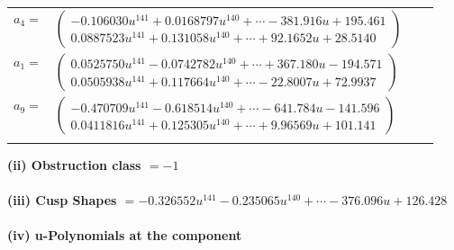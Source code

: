 \documentclass[1p]{elsarticle_modified}
\theoremstyle{definition}
\begin{document}
\begin{tabular}{m{7pt} m{180pt} m{7pt} m{180pt} }
\flushright $a_{4}=$&$\begin{pmatrix}-0.106030 u^{141}+0.0168797 u^{140}+\cdots-381.916 u+195.461\\0.0887523 u^{141}+0.131058 u^{140}+\cdots+92.1652 u+28.5140\end{pmatrix}$ \\
\flushright $a_{1}=$&$\begin{pmatrix}0.0525750 u^{141}-0.0742782 u^{140}+\cdots+367.180 u-194.571\\0.0505938 u^{141}+0.117664 u^{140}+\cdots-22.8007 u+72.9937\end{pmatrix}$ \\
\flushright $a_{9}=$&$\begin{pmatrix}-0.470709 u^{141}-0.618514 u^{140}+\cdots-641.784 u-141.596\\0.0411816 u^{141}+0.125305 u^{140}+\cdots+9.96569 u+101.141\end{pmatrix}$\\&\end{tabular}
\flushleft \textbf{(ii) Obstruction class $= -1$}\\~\\
\flushleft \textbf{(iii) Cusp Shapes $= -0.326552 u^{141}-0.235065 u^{140}+\cdots-376.096 u+126.428$}\\~\\
\newpage\renewcommand{\arraystretch}{1}
\flushleft \textbf{(iv) u-Polynomials at the component}\newline \\
\end{document}
